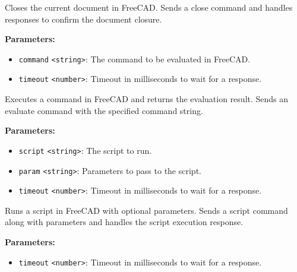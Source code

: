 \documentclass[12pt,a4paper]{article}
\begin{document}
\noindent Closes the current document in FreeCAD.
Sends a close command and handles responses to confirm the document closure.

\vspace{5mm}
\noindent {}


\noindent \textbf{Parameters:}
\begin{itemize}
  \item \texttt{command} \texttt{<string>}: The command to be evaluated in FreeCAD.
  \item \texttt{timeout} \texttt{<number>}: Timeout in milliseconds to wait for a response.
\end{itemize}

\noindent Executes a command in FreeCAD and returns the evaluation result.
Sends an evaluate command with the specified command string.

\vspace{5mm}
\noindent {}


\noindent \textbf{Parameters:}
\begin{itemize}
  \item \texttt{script} \texttt{<string>}: The script to run.
  \item \texttt{param} \texttt{<string>}: Parameters to pass to the script.
  \item \texttt{timeout} \texttt{<number>}: Timeout in milliseconds to wait for a response.
\end{itemize}

\noindent Runs a script in FreeCAD with optional parameters.
Sends a script command along with parameters and handles the script execution response.

\vspace{5mm}
\noindent {}


\noindent \textbf{Parameters:}
\begin{itemize}
  \item \texttt{timeout} \texttt{<number>}: Timeout in milliseconds to wait for a response.
\end{itemize}
\end{document}
